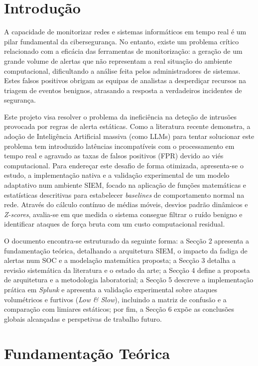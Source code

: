 \documentclass[12pt,a4paper]{article}
\begin{document}
\newpage

\section{Introdução}
A capacidade de monitorizar redes e sistemas informáticos em tempo real é um pilar fundamental da cibersegurança. No entanto, existe um problema crítico relacionado com a eficácia das ferramentas de monitorização: a geração de um grande volume de alertas que não representam a real situação do ambiente computacional, dificultando a análise feita pelos administradores de sistemas. Estes falsos positivos obrigam as equipas de analistas a desperdiçar recursos na triagem de eventos benignos, atrasando a resposta a verdadeiros incidentes de segurança.

Este projeto visa resolver o problema da ineficiência na deteção de intrusões provocada por regras de alerta estáticas. Como a literatura recente demonstra, a adoção de Inteligência Artificial massiva (como LLMs) para tentar solucionar este problema tem introduzido latências incompatíveis com o processamento em tempo real e agravado as taxas de falsos positivos (FPR) devido ao viés computacional. Para endereçar este desafio de forma otimizada, apresenta-se o estudo, a implementação nativa e a validação experimental de um modelo adaptativo num ambiente SIEM, focado na aplicação de funções matemáticas e estatísticas descritivas para estabelecer \textit{baselines} de comportamento normal na rede. Através do cálculo contínuo de médias móveis, desvios padrão dinâmicos e \textit{Z-scores}, avalia-se em que medida o sistema consegue filtrar o ruído benigno e identificar ataques de força bruta com um custo computacional residual.

O documento encontra-se estruturado da seguinte forma: a Secção 2 apresenta a fundamentação teórica, detalhando a arquitetura SIEM, o impacto da fadiga de alertas num SOC e a modelação matemática proposta; a Secção 3 detalha a revisão sistemática da literatura e o estado da arte; a Secção 4 define a proposta de arquitetura e a metodologia laboratorial; a Secção 5 descreve a implementação prática em \textit{Splunk} e apresenta a validação experimental sobre ataques volumétricos e furtivos (\textit{Low \& Slow}), incluindo a matriz de confusão e a comparação com limiares estáticos; por fim, a Secção 6 expõe as conclusões globais alcançadas e perspetivas de trabalho futuro.

\newpage

\section{Fundamentação Teórica}
\end{document}

